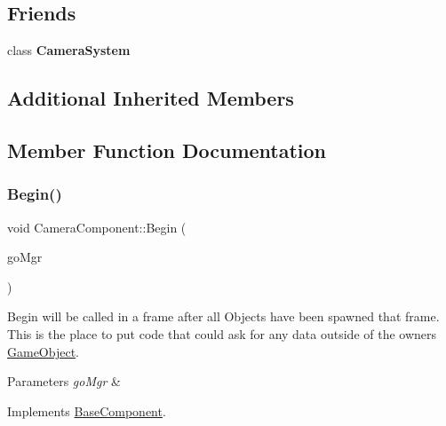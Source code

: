 \subsection*{Friends}
\begin{DoxyCompactItemize}
\item 
\mbox{\label{classCameraComponent_ace0f946b921a93dd4a83518b6bc7e40e}} 
class {\bfseries Camera\+System}
\end{DoxyCompactItemize}
\subsection*{Additional Inherited Members}


\subsection{Member Function Documentation}
\mbox{\label{classCameraComponent_a5cd6dd7439bfb54edb12b45abe32967c}} 
\subsubsection{\texorpdfstring{Begin()}{Begin()}}
{\footnotesize\ttfamily void Camera\+Component\+::\+Begin (\begin{DoxyParamCaption}\item[{\hyperlink{classGameObjectManager}{Game\+Object\+Manager} $\ast$}]{go\+Mgr }\end{DoxyParamCaption})\hspace{0.3cm}{\ttfamily [virtual]}}



Begin will be called in a frame after all Objects have been spawned that frame. This is the place to put code that could ask for any data outside of the owner\textquotesingle{}s \hyperlink{classGameObject}{Game\+Object}. 


\begin{DoxyParams}{Parameters}
{\em go\+Mgr} & \\
\hline
\end{DoxyParams}


Implements \hyperlink{classBaseComponent}{Base\+Component}.

\mbox{\label{classCameraComponent_ac1fd903a313d65bd8b7e8dcf7cab66b3}} 

